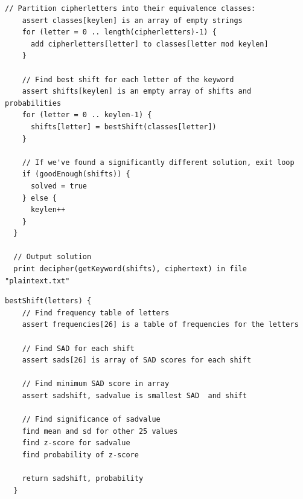 \documentclass{article}
\begin{document}
\begin{description}
\begin{Verbatim}[frame=single,label=Vigenere main]
    // Partition cipherletters into their equivalence classes:
    assert classes[keylen] is an array of empty strings
    for (letter = 0 .. length(cipherletters)-1) {
      add cipherletters[letter] to classes[letter mod keylen]
    }
    
    // Find best shift for each letter of the keyword
    assert shifts[keylen] is an empty array of shifts and probabilities
    for (letter = 0 .. keylen-1) {
      shifts[letter] = bestShift(classes[letter])
    }
    
    // If we've found a significantly different solution, exit loop
    if (goodEnough(shifts)) {
      solved = true
    } else {
      keylen++
    }
  }

  // Output solution
  print decipher(getKeyword(shifts), ciphertext) in file "plaintext.txt"
\end{Verbatim}


\begin{Verbatim}[frame=single,label=bestShift]
  bestShift(letters) {
    // Find frequency table of letters
    assert frequencies[26] is a table of frequencies for the letters
    
    // Find SAD for each shift
    assert sads[26] is array of SAD scores for each shift

    // Find minimum SAD score in array
    assert sadshift, sadvalue is smallest SAD  and shift

    // Find significance of sadvalue
    find mean and sd for other 25 values
    find z-score for sadvalue
    find probability of z-score

    return sadshift, probability
  }  
\end{Verbatim}

\end{description}
\end{document}

